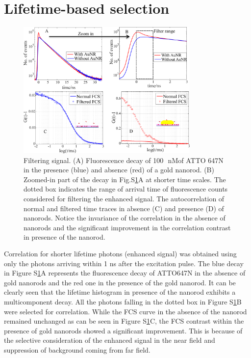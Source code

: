 \documentclass[11pt,a4paper,onecolumn]{article}
\newcommand{\nM}{\ensuremath{\,\textrm{nM}}}
\begin{document}
\section{Lifetime-based selection}
\begin{figure}[ht]
  \centering
  \includegraphics[width=0.8\textwidth]{lifetime_filtering.png}
  \makeatletter
  \renewcommand{\fnum@figure}{\figurename~S\thefigure}
  \makeatother{}
  \caption{Filtering signal. (A) Fluorescence decay of 100~\nM of ATTO 647N in the presence (blue) and absence (red) 
  of a gold nanorod. (B) Zoomed-in part of the decay in Fig.S\ref{SIfig:lifetime-filtering}A at shorter time scales. 
  The dotted box indicates the range of arrival time of fluorescence counts considered for filtering the enhanced 
  signal. The autocorrelation of normal and filtered time traces in absence (C) and presence (D) of nanorods. 
  Notice the invariance of the correlation in the absence of nanorods and the significant improvement in the 
  correlation contrast in presence of the nanorod.}
  \label{SIfig:lifetime-filtering}
\end{figure}
Correlation for shorter lifetime photons (enhanced signal) was obtained using only the photons arriving within 1 ns 
after the excitation pulse. The blue decay in Figure S\ref{SIfig:lifetime-filtering}A represents the fluorescence 
decay of ATTO647N in the absence of gold nanorods and the red one in the presence of the gold nanorod. It can be 
clearly seen that the lifetime histogram in presence of the nanorod exhibits a multicomponent decay. All the photons 
falling in the dotted box in Figure S\ref{SIfig:lifetime-filtering}B were selected for correlation. While the FCS 
curve in the absence of the nanorod remained unchanged as can be seen in Figure S\ref{SIfig:lifetime-filtering}C, 
the FCS contrast within the presence of gold nanorods showed a significant improvement. This is because of the 
selective consideration of the enhanced signal in the near field and suppression of background coming from far field.
\end{document}
